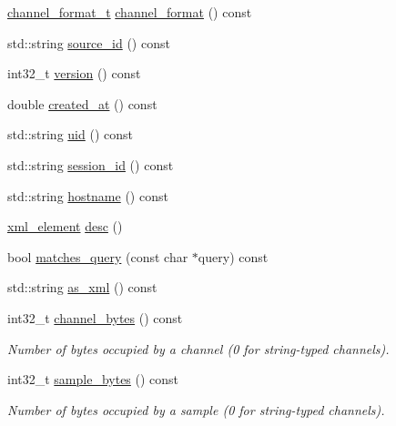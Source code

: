 \begin{DoxyCompactItemize}
\hyperlink{namespacelsl_a28d50dae6fd82eea8893ce3d63ccd46c}{channel\+\_\+format\+\_\+t} \hyperlink{classlsl_1_1stream__info_aa9695e52570e617d1c7dd4ea9f88b15d}{channel\+\_\+format} () const
\item 
std\+::string \hyperlink{classlsl_1_1stream__info_a1f20c68246a88047978d9b03e14a9d2b}{source\+\_\+id} () const
\item 
int32\+\_\+t \hyperlink{classlsl_1_1stream__info_aabd83f83d0abe8671e766e97f471dea9}{version} () const
\item 
double \hyperlink{classlsl_1_1stream__info_a9a5be16db42c09b1f0cced52a2259db8}{created\+\_\+at} () const
\item 
std\+::string \hyperlink{classlsl_1_1stream__info_ae6fa890ffd440f298dd02fe71eaf3b82}{uid} () const
\item 
std\+::string \hyperlink{classlsl_1_1stream__info_a59036c0e83bcb07b711ec7e3e3b15fef}{session\+\_\+id} () const
\item 
std\+::string \hyperlink{classlsl_1_1stream__info_a52db8d9e073297477d1183dfebe8dcda}{hostname} () const
\item 
\hyperlink{classlsl_1_1xml__element}{xml\+\_\+element} \hyperlink{classlsl_1_1stream__info_a7bbc53bb041757eb87c6c73564981390}{desc} ()
\item 
bool \hyperlink{classlsl_1_1stream__info_a6c3474322d467e8d8198c7a6e4c7ad76}{matches\+\_\+query} (const char $\ast$query) const
\item 
std\+::string \hyperlink{classlsl_1_1stream__info_ab1ccb9c2a1945c7051a0e90edaba8996}{as\+\_\+xml} () const
\item 
\mbox{\label{classlsl_1_1stream__info_a7eb192e1913596b017137347e4cc5847}} 
int32\+\_\+t \hyperlink{classlsl_1_1stream__info_a7eb192e1913596b017137347e4cc5847}{channel\+\_\+bytes} () const
\begin{DoxyCompactList}\small\item\em Number of bytes occupied by a channel (0 for string-\/typed channels). \end{DoxyCompactList}\item 
\mbox{\label{classlsl_1_1stream__info_ab68def3a9c81c289ba46a5b40c6b4084}} 
int32\+\_\+t \hyperlink{classlsl_1_1stream__info_ab68def3a9c81c289ba46a5b40c6b4084}{sample\+\_\+bytes} () const
\begin{DoxyCompactList}\small\item\em Number of bytes occupied by a sample (0 for string-\/typed channels). \end{DoxyCompactList}\item 

\end{DoxyCompactItemize}
